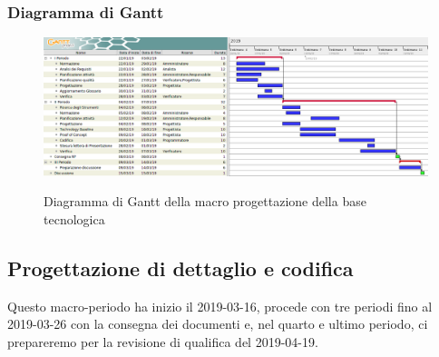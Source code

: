         \begin{landscape}
			\subsubsection{Diagramma di Gantt}
			\begin{figure}[H]
					\centering
					\includegraphics[scale=0.49]{img/Progettazione_della_base_tecnologica.png}\\
					\caption{Diagramma di Gantt della macro progettazione della base tecnologica}
			\end{figure}
		\end{landscape}
		\newpage

        \subsection{Progettazione di dettaglio e codifica}
        Questo macro-periodo ha inizio il 2019-03-16, procede con tre periodi fino al 2019-03-26 con la consegna dei documenti e, nel
        quarto e ultimo periodo, ci prepareremo per la revisione di qualifica del 2019-04-19.

